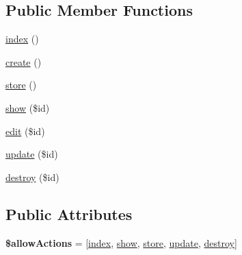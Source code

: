 \subsection*{Public Member Functions}
\begin{DoxyCompactItemize}
\item 
\hyperlink{classDMA_1_1Friends_1_1Classes_1_1API_1_1BaseResource_abcc8bf44739a7a7acc1a764a99651ed1}{index} ()
\item 
\hyperlink{classDMA_1_1Friends_1_1Classes_1_1API_1_1BaseResource_ae0964fc790c54db78c33efe31dc82639}{create} ()
\item 
\hyperlink{classDMA_1_1Friends_1_1Classes_1_1API_1_1BaseResource_ad7d43d3d9f020cf95b9da13ed8644cdb}{store} ()
\item 
\hyperlink{classDMA_1_1Friends_1_1Classes_1_1API_1_1BaseResource_aba517716fdd7a8bfeaa947bea12a52ed}{show} (\$id)
\item 
\hyperlink{classDMA_1_1Friends_1_1Classes_1_1API_1_1BaseResource_a865e74786986a18608d6e6c2881cc150}{edit} (\$id)
\item 
\hyperlink{classDMA_1_1Friends_1_1Classes_1_1API_1_1BaseResource_af371caf5658c4f4017536ffffa87a754}{update} (\$id)
\item 
\hyperlink{classDMA_1_1Friends_1_1Classes_1_1API_1_1BaseResource_a9a2d363ffd9c70ee237a4e865c09ec15}{destroy} (\$id)
\end{DoxyCompactItemize}
\subsection*{Public Attributes}
\begin{DoxyCompactItemize}
\item 
\hypertarget{classDMA_1_1Friends_1_1Classes_1_1API_1_1BaseResource_a6266e10631f12d6fe43da024ce724dad}{}{\bfseries \$allow\+Actions} = \mbox{[}\textquotesingle{}\hyperlink{classDMA_1_1Friends_1_1Classes_1_1API_1_1BaseResource_abcc8bf44739a7a7acc1a764a99651ed1}{index}\textquotesingle{}, \textquotesingle{}\hyperlink{classDMA_1_1Friends_1_1Classes_1_1API_1_1BaseResource_aba517716fdd7a8bfeaa947bea12a52ed}{show}\textquotesingle{}, \textquotesingle{}\hyperlink{classDMA_1_1Friends_1_1Classes_1_1API_1_1BaseResource_ad7d43d3d9f020cf95b9da13ed8644cdb}{store}\textquotesingle{}, \textquotesingle{}\hyperlink{classDMA_1_1Friends_1_1Classes_1_1API_1_1BaseResource_af371caf5658c4f4017536ffffa87a754}{update}\textquotesingle{}, \textquotesingle{}\hyperlink{classDMA_1_1Friends_1_1Classes_1_1API_1_1BaseResource_a9a2d363ffd9c70ee237a4e865c09ec15}{destroy}\textquotesingle{}\mbox{]}\label{classDMA_1_1Friends_1_1Classes_1_1API_1_1BaseResource_a6266e10631f12d6fe43da024ce724dad}

\end{DoxyCompactItemize}
